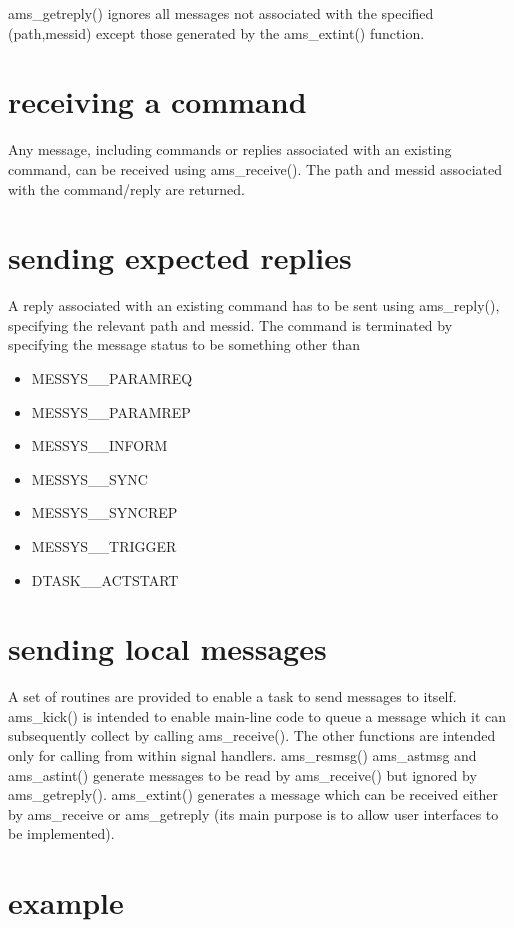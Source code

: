 ams\_getreply() ignores all messages not associated with the specified
(path,messid) except those generated by the ams\_extint() function.


\section {receiving a command}

Any message, including commands or replies associated with an existing
command, can be received using ams\_receive(). The path and messid
associated with the command/reply are returned.


\section {sending expected replies}

A reply associated with an existing command has to be sent using
ams\_reply(), specifying the relevant path and messid. The command is
terminated by specifying the message status to be something other than

\begin{itemize}
\item MESSYS\_\_PARAMREQ
\item MESSYS\_\_PARAMREP
\item MESSYS\_\_INFORM
\item MESSYS\_\_SYNC
\item MESSYS\_\_SYNCREP
\item MESSYS\_\_TRIGGER
\item DTASK\_\_ACTSTART
\end{itemize}


\section {sending local messages}

A set of routines are provided to enable a task to send messages to itself.
ams\_kick() is intended to enable main-line code to queue a message which
it can subsequently collect by calling ams\_receive(). The other functions
are intended only for calling from within signal handlers. ams\_resmsg()
ams\_astmsg and ams\_astint() generate messages to be read by ams\_receive()
but ignored by ams\_getreply(). ams\_extint() generates a message which can
be received either by ams\_receive or ams\_getreply (its main purpose is to
allow user interfaces to be implemented).


\section {example}

